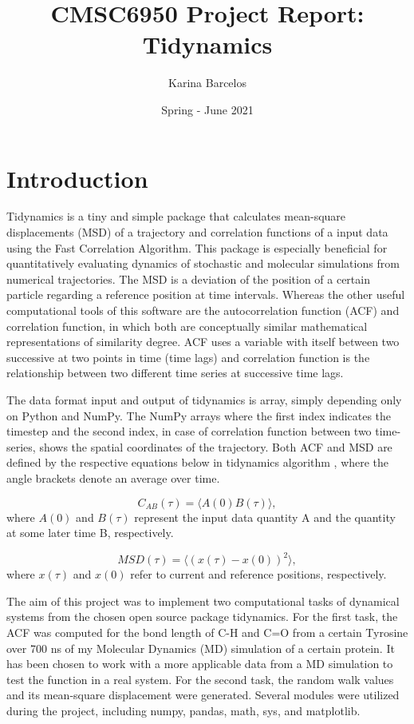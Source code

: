 \documentclass{article}
\title{CMSC6950 Project Report: Tidynamics}
\author{Karina Barcelos}
\date{Spring - June 2021}
\begin{document}
\maketitle

\section{Introduction}

Tidynamics \cite{Buyl2018} is a tiny and simple package that calculates mean-square displacements (MSD) of a trajectory and correlation functions of a input data using the Fast Correlation Algorithm. \cite{kneller1995nmoldyn} This package is especially beneficial for quantitatively evaluating dynamics of stochastic and molecular simulations from numerical trajectories. The MSD is a deviation of the position of a certain particle regarding a reference position at time intervals. Whereas the other useful computational tools of this software are the autocorrelation function (ACF) and correlation function, in which both are conceptually similar mathematical representations of similarity degree. ACF uses a variable with itself between two successive at two points in time (time lags) and correlation function is the relationship between two different time series at successive time lags.

The data format input and output of tidynamics \cite{Buyl2018} is array, simply depending only on Python and NumPy. The NumPy arrays where the first index indicates the timestep and the second index, in case of correlation function between two time-series, shows the spatial coordinates of the trajectory. Both ACF and MSD are defined by the respective equations below in tidynamics algorithm \cite{Buyl2018}, where the angle brackets denote an average over time. \cite{kneller1995nmoldyn}

\begin{equation}
C_{AB}(\tau) = \langle A(0) B(\tau) \rangle,
\label{eqn:correlation}
\end{equation}
where  $A(0)$ and $B(\tau)$ represent the input data quantity A and the quantity at some later time B, respectively.

\begin{equation}
MSD(\tau) = \langle (x(\tau) - x(0) )^2 \rangle,
\label{eqn:msd}
\end{equation}
where $x(\tau)$ and $x(0)$ refer to current and reference positions, respectively.

The aim of this project was to implement two computational tasks of dynamical systems from the chosen open source package tidynamics\cite{Buyl2018}. For the first task, the ACF was computed for the bond length of C-H and C=O from a certain Tyrosine over 700 ns of my Molecular Dynamics (MD) simulation of a certain protein. It has been chosen to work with a more applicable data from a MD simulation to test the function in a real system. For the second task, the random walk values and its mean-square displacement were generated. Several modules were utilized during the project, including numpy, pandas, math, sys, and matplotlib.
\end{document}
